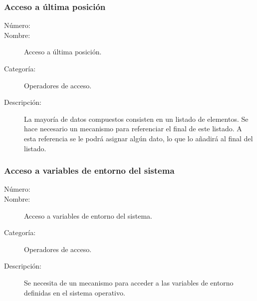 \subsubsection{Acceso a última posición}
	\begin{description}
		\item [Número:] \cn
		\item [Nombre:] Acceso a última posición.
		\item [Categoría:] Operadores de acceso.
		\item [Descripción:] La mayoría de datos compuestos consisten en un listado de elementos. Se hace necesario un mecanismo
		para referenciar el final de este listado. A esta referencia se le podrá asignar algún dato, lo que lo añadirá al final del listado.
	\end {description}

\subsubsection{Acceso a variables de entorno del sistema}
	\begin{description}
		\item [Número:] \cn
		\item [Nombre:] Acceso a variables de entorno del sistema.
		\item [Categoría:] Operadores de acceso.
		\item [Descripción:] Se necesita de un mecanismo para acceder a las variables de entorno definidas en el sistema operativo. 
	\end{description}

